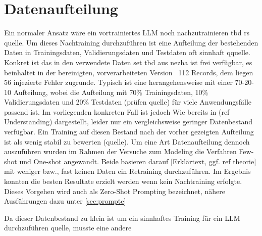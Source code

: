 \section{Datenaufteilung}
\label{sec:datasplit}
Ein normaler Ansatz wäre ein vortrainiertes LLM noch nachzutrainieren tbd rs quelle. Um dieses Nachtraining durchzuführen ist eine Aufteilung der bestehenden Daten in Trainingsdaten, Validierungsdaten und Testdaten oft sinnhaft qquelle. Konkret ist das in den verwendete Daten set tbd aus nezha ist frei verfügbar, es beinhaltet in der bereinigten, vorverarbeiteten Version ~112 Records, dem liegen 56 injezierte Fehler zugrunde. Typisch ist eine herangehensweise mit einer 70-20-10 Aufteilung, wobei die Aufteilung mit 70\% Trainingsdaten, 10\% Validierungsdaten und  20\% Testdaten (prüfen quelle) für viele Anwendungsfälle passend ist. Im vorliegenden konkreten Fall ist jedoch Wie bereits in  (ref Understanding) dargestellt, leider nur ein vergleichsweise geringer Datenbestand verfügbar. Ein Training auf diesen Bestand nach der vorher gezeigten Aufteilung ist als wenig stabil zu bewerten (quelle). Um eine Art Datenaufteilung dennoch auszuführen wurden im Rahmen der Versuche zum Modeling die Verfahren Few-shot und One-shot angewandt. Beide basieren darauf [Erklärtext, ggf. ref theorie] mit weniger bzw., fast keinen Daten ein Retraining durchzuführen. Im Ergebnis konnten die besten Resultate erzielt werden wenn kein Nachtraining erfolgte. Dieses Vorgehen wird auch als Zero-Shot Prompting bezeichnet, nähere Ausführungen dazu unter \autoref{sec:prompte}


Da dieser Datenbestand zu klein ist um ein sinnhaftes Training für ein LLM durchzuführen quelle, musste eine andere 

